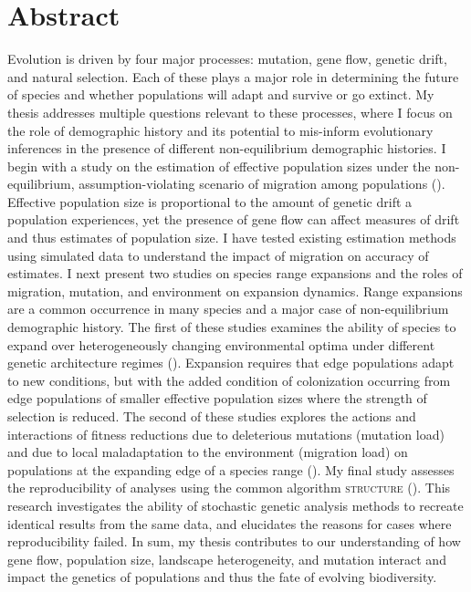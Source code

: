 \chapter*{Abstract}

Evolution is driven by four major processes: mutation, gene flow, genetic drift, and natural selection. Each of these plays a major role in determining the future of species and whether populations will adapt and survive or go extinct. My thesis addresses multiple questions relevant to these processes, where I focus on the role of demographic history and its potential to mis-inform evolutionary inferences in the presence of different non-equilibrium demographic histories. I begin with a study on the estimation of effective population sizes under the non-equilibrium, assumption-violating scenario of migration among populations (). Effective population size is proportional to the amount of genetic drift a population experiences, yet the presence of gene flow can affect measures of drift and thus estimates of population size. I have tested existing estimation methods using simulated data to understand the impact of migration on accuracy of estimates. 
I next present two studies on species range expansions and the roles of migration, mutation, and environment on expansion dynamics. Range expansions are a common occurrence in many species and a major case of non-equilibrium demographic history. The first of these studies examines the ability of species to expand over heterogeneously changing environmental optima under different genetic architecture regimes (). Expansion requires that edge populations adapt to new conditions, but with the added condition of colonization occurring from edge populations of smaller effective population sizes where the strength of selection is reduced. The second of these studies explores the actions and interactions of fitness reductions due to deleterious mutations (mutation load) and due to local maladaptation to the environment (migration load) on populations at the expanding edge of a species range (). My final study assesses the reproducibility of analyses using the common algorithm \textsc{structure} (). This research investigates the ability of stochastic genetic analysis methods to recreate identical results from the same data, and elucidates the reasons for cases where reproducibility failed. In sum, my thesis contributes to our understanding of how gene flow, population size, landscape heterogeneity, and mutation interact and impact the genetics of populations and thus the fate of evolving biodiversity.

